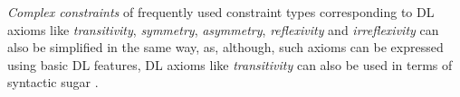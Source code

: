 \documentclass[a4paper,fontsize=11pt]{scrartcl}
\newcommand{\ms}[1]{\texttt{#1}}
\newenvironment{DL}{
  \vspace{0cm}
	\begin{center}
  \begin{tabular}{r l}

}{
  \end{tabular}
	\end{center}
}
\begin{document}
\emph{Complex constraints} of frequently used constraint types corresponding to DL axioms like 
\emph{transitivity}, \emph{symmetry}, \emph{asymmetry}, \emph{reflexivity} and \emph{irreflexivity}
can also be simplified in the same way, 
as, although, such axioms can be expressed using basic DL features, 
DL axioms like \emph{transitivity} can also be used in terms of syntactic sugar \cite{BoschEckert2015-2}.
%
%
%
%
%
\end{document}
